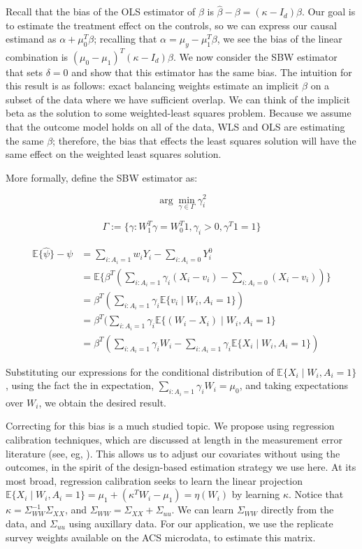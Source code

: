 \documentclass[12pt]{article}
\begin{document}
Recall that the bias of the OLS estimator of $\beta$ is $\hat{\beta} - \beta = (\kappa - I_d)\beta$. Our goal is to estimate the treatment effect on the controls, so we can express our causal estimand as $\alpha + \mu_0^T\beta$; recalling that $\alpha = \mu_y - \mu_1^T\beta$, we see the bias of the linear combination is $(\mu_0 - \mu_1)^T(\kappa - I_d)\beta$. We now consider the SBW estimator that sets $\delta = 0$ and show that this estimator has the same bias. The intuition for this result is as follows: exact balancing weights estimate an implicit $\beta$ on a subset of the data where we have sufficient overlap. We can think of the implicit beta as the solution to some weighted-least squares problem. Because we assume that the outcome model holds on all of the data, WLS and OLS are estimating the same $\beta$; therefore, the bias that effects the least squares solution will have the same effect on the weighted least squares solution.

More formally, define the SBW estimator as:

$$
\arg\min_{\gamma \in \Gamma} \gamma_i^2
$$

$$
\Gamma := \{\gamma: W_1^T\gamma = W_0^T1, \gamma_i > 0, \gamma^T1 = 1\}
$$

\begin{align*}
    \mathbb{E}\{\hat{\psi}\} - \psi &= \sum_{i: A_i = 1}w_iY_i - \sum_{i: A_i = 0}Y_i^0 \\
    &= \mathbb{E}\{\beta^T(\sum_{i: A_i = 1} \gamma_i (X_i - v_i) - \sum_{i: A_i = 0} (X_i - v_i))\} \\
    &= \beta^T(\sum_{i: A_i = 1} \gamma_i\mathbb{E}\{v_i \mid W_i, A_i = 1\}) \\
    &= \beta^T(\sum_{i: A_i = 1} \gamma_i\mathbb{E}\{(W_i - X_i) \mid W_i, A_i = 1\} \\
    &= \beta^T(\sum_{i: A_i = 1} \gamma_iW_i - \sum_{i: A_i = 1} \gamma_i\mathbb{E}\{X_i \mid W_i, A_i = 1\})
\end{align*}

Substituting our expressions for the conditional distribution of $\mathbb{E}\{X_i \mid W_i, A_i = 1\}$, using the fact the in expectation, $\sum_{i: A_i = 1}\gamma_iW_i = \mu_0$, and taking expectations over $W_i$, we obtain the desired result.

Correcting for this bias is a much studied topic. We propose using regression calibration techniques, which are discussed at length in the measurement error literature (see, eg, \cite{carroll2006measurement}). This allows us to adjust our covariates without using the outcomes, in the spirit of the design-based estimation strategy we use here. At its most broad, regression calibration seeks to learn the linear projection $\mathbb{E}\{X_i \mid W_i, A_i = 1\} = \mu_1 + (\kappa^T W_i - \mu_1) = \eta(W_i)$ by learning $\kappa$. Notice that $\kappa = \Sigma_{WW}^{-1}\Sigma_{XX}$, and $\Sigma_{WW} = \Sigma_{XX} + \Sigma_{uu}$. We can learn $\Sigma_{WW}$ directly from the data, and $\Sigma_{uu}$ using auxillary data. For our application, we use the replicate survey weights available on the ACS microdata, to estimate this matrix. 
\end{document}
